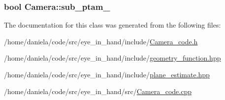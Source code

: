 \hypertarget{classCamera_a95c8cb7d543f8a1c4ba50c1c82ce6f82}{
\subsubsection[{sub\-\_\-ptam\-\_\-2}]{\setlength{\rightskip}{0pt plus 5cm}bool Camera\-::sub\-\_\-ptam\-\_}}\label{classCamera_a95c8cb7d543f8a1c4ba50c1c82ce6f82}


The documentation for this class was generated from the following files\-:\begin{DoxyCompactItemize}
\item 
/home/daniela/code/src/eye\-\_\-in\-\_\-hand/include/\hyperlink{Camera__code_8h}{Camera\-\_\-code.\-h}\item 
/home/daniela/code/src/eye\-\_\-in\-\_\-hand/include/\hyperlink{geometry__function_8hpp}{geometry\-\_\-function.\-hpp}\item 
/home/daniela/code/src/eye\-\_\-in\-\_\-hand/include/\hyperlink{plane__estimate_8hpp}{plane\-\_\-estimate.\-hpp}\item 
/home/daniela/code/src/eye\-\_\-in\-\_\-hand/src/\hyperlink{Camera__code_8cpp}{Camera\-\_\-code.\-cpp}\end{DoxyCompactItemize}
